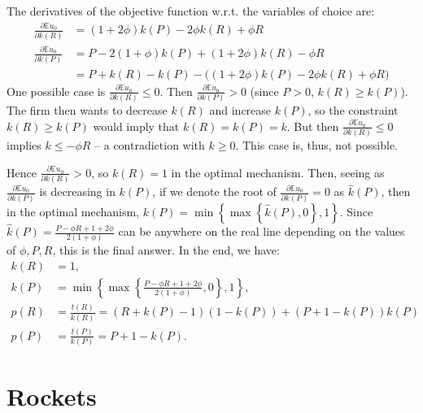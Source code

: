 \documentclass[a4paper]{article}
\begin{document}
\begin{enumerate}
	The derivatives of the objective function w.r.t. the variables of choice are:
	\begin{align*}
		\frac{\partial \mathbb{E}u_0}{\partial k(R)} &= (1+2\phi)k(P) -2\phi k(R) + \phi R
		\\
		\frac{\partial \mathbb{E}u_0}{\partial k(P)} &= P - 2(1+\phi)k(P) + (1+2\phi) k(R) - \phi R
		\\
		&= P + k(R) - k(P) - \Big( (1+2\phi)k(P) -2\phi k(R) + \phi R \Big)
	\end{align*}
	One possible case is $\frac{\partial \mathbb{E}u_0}{\partial k(R)} \leq 0$. Then $\frac{\partial \mathbb{E}u_0}{\partial k(P)} > 0$ (since $P>0$, $k(R)\geq k(P)$). The firm then wants to decrease $k(R)$ and increase $k(P)$, so the constraint $k(R)\geq k(P)$ would imply that $k(R) = k(P) = k$. But then $\frac{\partial \mathbb{E}u_0}{\partial k(R)} \leq 0$ implies $k \leq - \phi R$ -- a contradiction with $k \geq 0$. This case is, thus, not possible.
	
	Hence $\frac{\partial \mathbb{E}u_0}{\partial k(R)} > 0$, so $k(R)=1$ in the optimal mechanism. Then, seeing as $\frac{\partial \mathbb{E}u_0}{\partial k(P)}$ is decreasing in $k(P)$, if we denote the root of $\frac{\partial \mathbb{E}u_0}{\partial k(P)}=0$ as $\hat{k}(P)$, then in the optimal mechanism, $k(P) = \min \left\{ \max \left\{ \hat{k}(P), 0 \right\}, 1 \right\}$.
	Since $\hat{k}(P) = \frac{P-\phi R + 1+2\phi}{2(1+\phi)}$ can be anywhere on the real line depending on the values of $\phi,P,R$, this is the final answer. In the end, we have:
	\begin{align*}
		k(R) &= 1,
		\\
		k(P) &= \min \left\{ \max \left\{ \frac{P-\phi R + 1+2\phi}{2(1+\phi)}, 0 \right\}, 1 \right\},
		\\
		p(R) &= \frac{t(R)}{k(R)} = (R + k(P) - 1) (1-k(P)) + (P + 1 - k(P)) k(P)
		\\
		p(P) &= \frac{t(P)}{k(P)} = P + 1 - k(P).
	\end{align*}
\end{enumerate}
\fi 



\section{Rockets}
\end{document}
